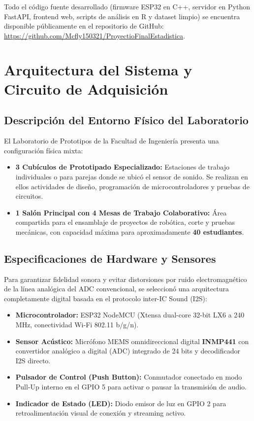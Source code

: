 \documentclass{article}
\begin{document}
Todo el código fuente desarrollado (firmware ESP32 en C++, servidor en Python FastAPI, frontend web, scripts de análisis en R y dataset limpio) se encuentra disponible públicamente en el repositorio de GitHub: \url{https://github.com/Mcfly150321/ProyectioFinalEstadistica}.

\section{Arquitectura del Sistema y Circuito de Adquisición}

\subsection{Descripción del Entorno Físico del Laboratorio}
El Laboratorio de Prototipos de la Facultad de Ingeniería presenta una configuración física mixta:
\begin{itemize}
    \item \textbf{3 Cubículos de Prototipado Especializado:} Estaciones de trabajo individuales o para parejas donde se ubicó el sensor de sonido. Se realizan en ellos actividades de diseño, programación de microcontroladores y pruebas de circuitos.
    \item \textbf{1 Salón Principal con 4 Mesas de Trabajo Colaborativo:} Área compartida para el ensamblaje de proyectos de robótica, corte y pruebas mecánicas, con capacidad máxima para aproximadamente \textbf{40 estudiantes}.
\end{itemize}

\subsection{Especificaciones de Hardware y Sensores}
Para garantizar fidelidad sonora y evitar distorsiones por ruido electromagnético de la línea analógica del ADC convencional, se seleccionó una arquitectura completamente digital basada en el protocolo inter-IC Sound (I2S):
\begin{itemize}
    \item \textbf{Microcontrolador:} ESP32 NodeMCU (Xtensa dual-core 32-bit LX6 a 240 MHz, conectividad Wi-Fi 802.11 b/g/n).
    \item \textbf{Sensor Acústico:} Micrófono MEMS omnidireccional digital \textbf{INMP441} con convertidor analógico a digital (ADC) integrado de 24 bits y decodificador I2S directo.
    \item \textbf{Pulsador de Control (Push Button):} Conmutador conectado en modo Pull-Up interno en el GPIO 5 para activar o pausar la transmisión de audio.
    \item \textbf{Indicador de Estado (LED):} Diodo emisor de luz en GPIO 2 para retroalimentación visual de conexión y streaming activo.
\end{itemize}
\end{document}
